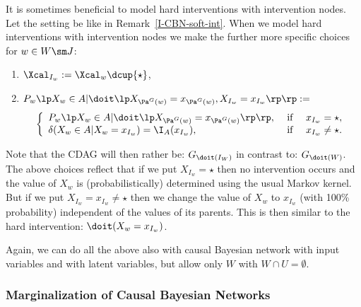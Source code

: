 \begin{Rem}
    It is sometimes beneficial to model hard interventions with intervention nodes.
    Let the setting be like in Remark~\ref{I-CBN-soft-int}.
    When we model hard interventions with intervention nodes we make the further more specific choices for $ w\in W \sm J$:
    \begin{enumerate}
        \item $\Xcal_{I_w} := \Xcal_w \dcup \{\star\}$,
        \item $ P_w\lp X_w \in A|\doit\lp X_{\Pa^G(w)}=x_{\Pa^G(w)} ,X_{I_w}=x_{I_w}\rp\rp : =$
            \[ \left\{ \begin{array}{lll}
                        P_w\lp X_w \in A|\doit\lp X_{\Pa^G(w)}=x_{\Pa^G(w)}\rp\rp, & \text{ if } & x_{I_w} = \star, \\
                        \delta(X_w \in A|X_w =x_{I_w}) = \I_A(x_{I_w}),  & \text{ if } & x_{I_w} \neq \star. 
                \end{array}\right.\]
    \end{enumerate}
    Note that the CDAG will then rather be: $G_{\doit(I_W)}$ in contrast to: $G_{\doit(W)}$. \\
    The above choices reflect that if we put $X_{I_w} = \star$ then no intervention occurs and the value of $X_w$ is
    (probabilistically) determined using the usual Markov kernel. 
    But if we put 
    $X_{I_w} = x_{I_w}  \neq\star$ then we change the value of $X_w$ to $x_{I_w}$ (with 100\% probability) 
    independent of the values of its parents. 
    This is then similar to the hard intervention: $\doit(X_w = x_{I_w})$.
\end{Rem}

\begin{Rem}
    Again, we can do all the above also with causal Bayesian network with input variables and with latent variables, 
    but allow only $W$ with $W \cap U = \emptyset$.
\end{Rem}

\subsubsection{Marginalization of Causal Bayesian Networks}

